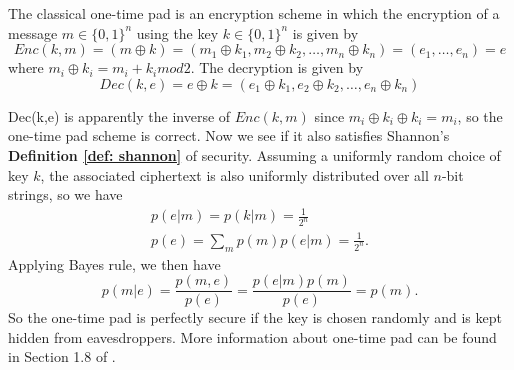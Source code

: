 
\begin{definition} \label{def: classical one-time pad scheme}
The classical one-time pad is an encryption scheme in which the encryption of a message $m \in \{0, 1\}^n$ using the key $k \in \{0, 1\}^n$ is given by
\begin{equation}
    Enc(k,m)=(m \oplus k)=(m_1 \oplus k_1, m_2 \oplus k_2, \hdots, m_n \oplus k_n)=(e_1, \hdots, e_n)=e
\end{equation}
where $m_i \oplus k_i = m_i + k_i mod 2$. The decryption is given by
\begin{equation}
Dec(k, e)=e \oplus k = (e_1 \oplus k_1, e_2 \oplus k_2, \hdots, e_n \oplus k_n)
\end{equation}
\end{definition}

Dec(k,e) is apparently the inverse of $Enc(k,m)$ since $m_i \oplus k_i \oplus k_i=m_i$, so the one-time pad scheme is correct. Now we see if it also satisfies Shannon's \textbf{Definition \ref{def: shannon}} of security. Assuming a uniformly random choice of key $k$, the associated ciphertext is also uniformly distributed over all $n$-bit strings, so we have 
\begin{gather}
    p(e|m)=p(k|m)=\frac{1}{2^n}\\
    p(e)=\sum_m p(m) p(e|m)=\frac{1}{2^n}.
\end{gather}
Applying Bayes rule, we then have $$p(m|e)=\frac{p(m,e)}{p(e)}=\frac{p(e|m)p(m)}{p(e)}=p(m).$$
So the one-time pad is perfectly secure if the key is chosen randomly and is kept hidden from eavesdroppers. More information about one-time pad can be found in Section 1.8 of \cite{Wehner:notes}.

